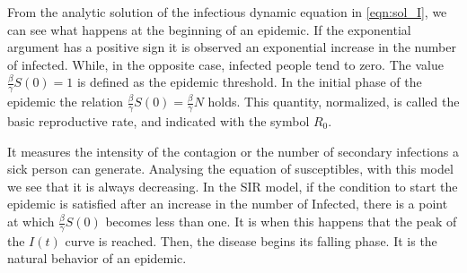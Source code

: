 From the analytic solution of the infectious dynamic equation in \ref{eqn:sol_I}, we can see what happens at the beginning of an epidemic.  If the exponential argument has a positive sign it is observed an exponential increase in the number of infected. While, in the opposite case, infected people tend to zero. 
The value $\frac{ \beta}{\gamma} S(0) = 1$ is defined as the epidemic threshold. In the initial phase of the epidemic the relation $\frac{ \beta}{\gamma} S(0) = \frac{ \beta}{\gamma} N $  holds. 
This quantity, normalized, is called the basic reproductive rate, and indicated with the symbol $R_0$.

It measures the intensity of the contagion or the number of secondary infections a sick person can generate. Analysing the equation of susceptibles, with this model we see that it is always decreasing. In the SIR model, if the condition to start the epidemic is satisfied after an increase in the number of Infected, there is a point at which $\frac { \beta}{\gamma} S(0)$ becomes less than one. It is when this happens that the peak of the $I(t)$ curve is reached. Then, the disease begins its falling phase. It is the natural behavior of an epidemic.

